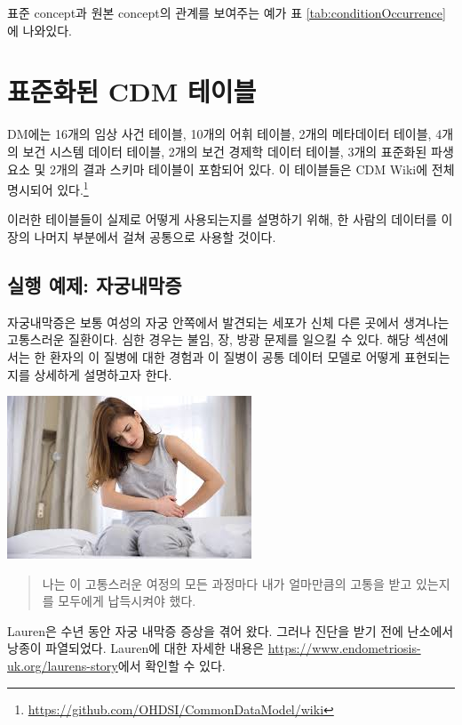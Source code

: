 \documentclass[11pt]{book}
\let\rmarkdownfootnote\footnote%
\def\footnote{\protect\rmarkdownfootnote}
\theoremstyle{definition}
\theoremstyle{definition}
\theoremstyle{definition}
\theoremstyle{remark}
\begin{document}
표준 concept과 원본 concept의 관계를 보여주는 예가 표
\ref{tab:conditionOccurrence}에 나와있다.

\section{표준화된 CDM 테이블}\label{-cdm-}


DM에는 16개의 임상 사건 테이블, 10개의 어휘 테이블, 2개의 메타데이터
테이블, 4개의 보건 시스템 데이터 테이블, 2개의 보건 경제학 데이터
테이블, 3개의 표준화된 파생 요소 및 2개의 결과 스키마 테이블이 포함되어
있다. 이 테이블들은 CDM Wiki에 전체 명시되어 있다.\footnote{\url{https://github.com/OHDSI/CommonDataModel/wiki}}

이러한 테이블들이 실제로 어떻게 사용되는지를 설명하기 위해, 한 사람의
데이터를 이 장의 나머지 부분에서 걸쳐 공통으로 사용할 것이다.

\subsection{실행 예제: 자궁내막증}\label{--}

자궁내막증은 보통 여성의 자궁 안쪽에서 발견되는 세포가 신체 다른 곳에서
생겨나는 고통스러운 질환이다. 심한 경우는 불임, 장, 방광 문제를 일으킬
수 있다. 해당 섹션에서는 한 환자의 이 질병에 대한 경험과 이 질병이 공통
데이터 모델로 어떻게 표현되는지를 상세하게 설명하고자 한다.

\begin{center}\includegraphics[width=0.5\linewidth]{images/CommonDataModel/Lauren} \end{center}

\begin{quote}
나는 이 고통스러운 여정의 모든 과정마다 내가 얼마만큼의 고통을 받고
있는지를 모두에게 납득시켜야 했다.
\end{quote}

Lauren은 수년 동안 자궁 내막증 증상을 겪어 왔다. 그러나 진단을 받기 전에
난소에서 낭종이 파열되었다. Lauren에 대한 자세한 내용은
\url{https://www.endometriosis-uk.org/laurens-story}에서 확인할 수 있다.
\end{document}
